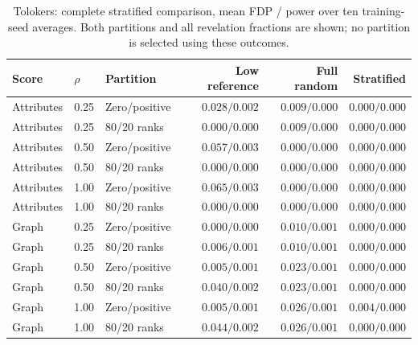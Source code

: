 \begin{table}[t]\centering\small
\caption{Tolokers: complete stratified comparison, mean FDP / power over ten training-seed averages. Both partitions and all revelation fractions are shown; no partition is selected using these outcomes.}
\begin{tabular}{lllrrr}\toprule Score & $\rho$ & Partition & Low reference & Full random & Stratified\\\midrule
Attributes & 0.25 & Zero/positive & $0.028/0.002$ & $0.009/0.000$ & $0.000/0.000$ \\
Attributes & 0.25 & 80/20 ranks & $0.000/0.000$ & $0.009/0.000$ & $0.000/0.000$ \\
Attributes & 0.50 & Zero/positive & $0.057/0.003$ & $0.000/0.000$ & $0.000/0.000$ \\
Attributes & 0.50 & 80/20 ranks & $0.000/0.000$ & $0.000/0.000$ & $0.000/0.000$ \\
Attributes & 1.00 & Zero/positive & $0.065/0.003$ & $0.000/0.000$ & $0.000/0.000$ \\
Attributes & 1.00 & 80/20 ranks & $0.000/0.000$ & $0.000/0.000$ & $0.000/0.000$ \\
Graph & 0.25 & Zero/positive & $0.000/0.000$ & $0.010/0.001$ & $0.000/0.000$ \\
Graph & 0.25 & 80/20 ranks & $0.006/0.001$ & $0.010/0.001$ & $0.000/0.000$ \\
Graph & 0.50 & Zero/positive & $0.005/0.001$ & $0.023/0.001$ & $0.000/0.000$ \\
Graph & 0.50 & 80/20 ranks & $0.040/0.002$ & $0.023/0.001$ & $0.000/0.000$ \\
Graph & 1.00 & Zero/positive & $0.005/0.001$ & $0.026/0.001$ & $0.004/0.000$ \\
Graph & 1.00 & 80/20 ranks & $0.044/0.002$ & $0.026/0.001$ & $0.000/0.000$ \\
\bottomrule\end{tabular}\end{table}

